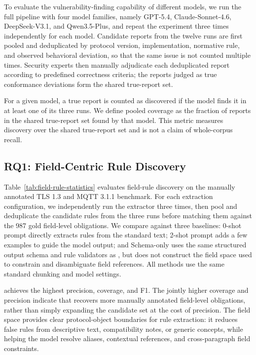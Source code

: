 To evaluate the vulnerability-finding capability of different models, we run
the full pipeline with four model families, namely GPT-5.4, Claude-Sonnet-4.6,
DeepSeek-V3.1, and Qwen3.5-Plus, and repeat the experiment three times
independently for each model.
Candidate reports from the twelve runs are first pooled and deduplicated by
protocol version, implementation, normative rule, and observed behavioral
deviation, so that the same issue is not counted multiple times. Security
experts then manually adjudicate each deduplicated report according to
predefined correctness criteria; the reports judged as true conformance
deviations form the shared true-report set.

For a given model, a true report is counted as discovered if the model finds it
in at least one of its three runs. We define pooled coverage as the fraction of
reports in the shared true-report set found by that model. This metric measures
discovery over the shared true-report set and is not a claim of whole-corpus
recall.

\subsection{RQ1: Field-Centric Rule Discovery}

Table~\ref{tab:field-rule-statistics} evaluates field-rule discovery on the manually
annotated TLS 1.3 and MQTT 3.1.1 benchmark. For each extraction configuration,
we independently run the extractor three times, then pool and deduplicate the
candidate rules from the three runs before matching them against the 987 gold
field-level obligations. We compare against three baselines: 0-shot prompt
directly extracts rules from the standard text; 2-shot prompt adds a few
examples to guide the model output; and Schema-only uses the same structured
output schema and rule validators as \tool{}, but does not construct the field
space used to constrain and disambiguate field references. All methods use the
same standard chunking and model settings.

\tool{} achieves the highest precision, coverage, and F1. The jointly higher
coverage and precision indicate that \tool{} recovers more manually annotated
field-level obligations, rather than simply expanding the candidate set at the
cost of precision. The field space provides clear protocol-object boundaries
for rule extraction: it reduces false rules from descriptive text,
compatibility notes, or generic concepts, while helping the model resolve
aliases, contextual references, and cross-paragraph field constraints.


